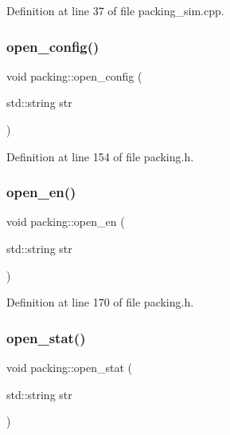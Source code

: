 Definition at line 37 of file packing\+\_\+sim.\+cpp.

\mbox{\label{classpacking_a0c981ac48ac009de032b346acd442527}} 
\subsubsection{\texorpdfstring{open\+\_\+config()}{open\_config()}}
{\footnotesize\ttfamily void packing\+::open\+\_\+config (\begin{DoxyParamCaption}\item[{std\+::string}]{str }\end{DoxyParamCaption})\hspace{0.3cm}{\ttfamily [inline]}}



Definition at line 154 of file packing.\+h.

\mbox{\label{classpacking_a8afd538218a84fa24e14d58ecbd8066b}} 
\subsubsection{\texorpdfstring{open\+\_\+en()}{open\_en()}}
{\footnotesize\ttfamily void packing\+::open\+\_\+en (\begin{DoxyParamCaption}\item[{std\+::string}]{str }\end{DoxyParamCaption})\hspace{0.3cm}{\ttfamily [inline]}}



Definition at line 170 of file packing.\+h.

\mbox{\label{classpacking_aafe0cb05420e66caa923930222ff1bb0}} 
\subsubsection{\texorpdfstring{open\+\_\+stat()}{open\_stat()}}
{\footnotesize\ttfamily void packing\+::open\+\_\+stat (\begin{DoxyParamCaption}\item[{std\+::string}]{str }\end{DoxyParamCaption})\hspace{0.3cm}{\ttfamily [inline]}}



